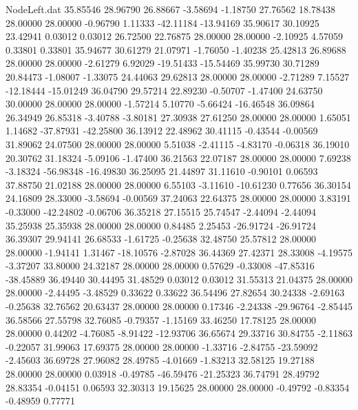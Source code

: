 \begin{filecontents}{NodeLeft.dat}
  35.85546   28.96790   26.88667    -3.58694   -1.18750   27.76562   18.78438   28.00000   28.00000   -0.96790    1.11333  -42.11184  -13.94169
  35.90617   30.10925   23.42941     0.03012    0.03012   26.72500   22.76875   28.00000   28.00000   -2.10925    4.57059    0.33801    0.33801
  35.94677   30.61279   21.07971    -1.76050   -1.40238   25.42813   26.89688   28.00000   28.00000   -2.61279    6.92029  -19.51433  -15.54469
  35.99730   30.71289   20.84473    -1.08007   -1.33075   24.44063   29.62813   28.00000   28.00000   -2.71289    7.15527  -12.18444  -15.01249
  36.04790   29.57214   22.89230    -0.50707   -1.47400   24.63750   30.00000   28.00000   28.00000   -1.57214    5.10770   -5.66424  -16.46548
  36.09864   26.34949   26.85318    -3.40788   -3.80181   27.30938   27.61250   28.00000   28.00000    1.65051    1.14682  -37.87931  -42.25800
  36.13912   22.48962   30.41115    -0.43544   -0.00569   31.89062   24.07500   28.00000   28.00000    5.51038   -2.41115   -4.83170   -0.06318
  36.19010   20.30762   31.18324    -5.09106   -1.47400   36.21563   22.07187   28.00000   28.00000    7.69238   -3.18324  -56.98348  -16.49830
  36.25095   21.44897   31.11610    -0.90101    0.06593   37.88750   21.02188   28.00000   28.00000    6.55103   -3.11610  -10.61230    0.77656
  36.30154   24.16809   28.33000    -3.58694   -0.00569   37.24063   22.64375   28.00000   28.00000    3.83191   -0.33000  -42.24802   -0.06706
  36.35218   27.15515   25.74547    -2.44094   -2.44094   35.25938   25.35938   28.00000   28.00000    0.84485    2.25453  -26.91724  -26.91724
  36.39307   29.94141   26.68533    -1.61725   -0.25638   32.48750   25.57812   28.00000   28.00000   -1.94141    1.31467  -18.10576   -2.87028
  36.44369   27.42371   28.33008    -4.19575   -3.37207   33.80000   24.32187   28.00000   28.00000    0.57629   -0.33008  -47.85316  -38.45889
  36.49440   30.44495   31.48529     0.03012    0.03012   31.55313   21.04375   28.00000   28.00000   -2.44495   -3.48529    0.33622    0.33622
  36.54496   27.82654   30.24338    -2.69163   -0.25638   32.76562   20.63437   28.00000   28.00000    0.17346   -2.24338  -29.96764   -2.85445
  36.58566   27.55798   32.76085    -0.79357   -1.15169   33.46250   17.78125   28.00000   28.00000    0.44202   -4.76085   -8.91422  -12.93706
  36.65674   29.33716   30.84755    -2.11863   -0.22057   31.99063   17.69375   28.00000   28.00000   -1.33716   -2.84755  -23.59092   -2.45603
  36.69728   27.96082   28.49785    -4.01669   -1.83213   32.58125   19.27188   28.00000   28.00000    0.03918   -0.49785  -46.59476  -21.25323
  36.74791   28.49792   28.83354    -0.04151    0.06593   32.30313   19.15625   28.00000   28.00000   -0.49792   -0.83354   -0.48959    0.77771

\end{filecontents}

